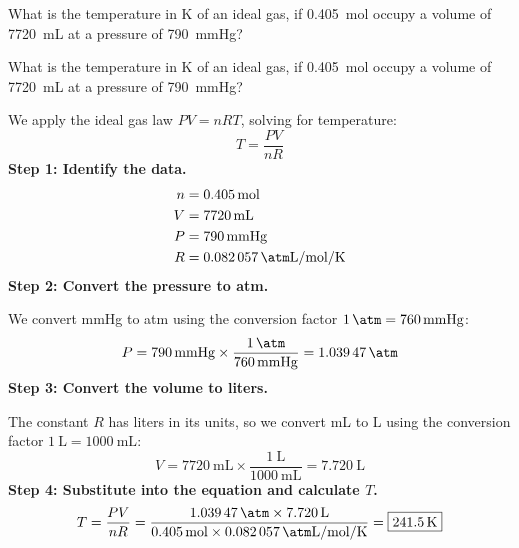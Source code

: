 \begin{exercise}
    What is the temperature in \unit{\kelvin} of an ideal gas, if \qty{0.405}{\mole} occupy a volume of \qty{7720}{\mL} at a pressure of \qty{790}{\mmHg}?
    \begin{solu}
        What is the temperature in \unit{\kelvin} of an ideal gas, if \qty{0.405}{\mole} occupy a volume of \qty{7720}{\mL} at a pressure of \qty{790}{\mmHg}?

        We apply the ideal gas law $PV = nRT$, solving for temperature:
        \begin{equation*}
            T = \frac{PV}{nR}
        \end{equation*}
        \textbf{Step 1: Identify the data.}
        \begin{align*}
            n &= \qty{0.405}{\mol} \\
            V &= \qty{7720}{\mL} \\
            P &= \qty{790}{\mmHg} \\
            R &= \qty{0.082057}{\atm\liter\per\mol\per\kelvin}
        \end{align*}
        \textbf{Step 2: Convert the pressure to atm.}

        We convert mmHg to atm using the conversion factor $\qty{1}{\atm} = \qty{760}{\mmHg}$:
        \begin{equation*}
            P = \qty{790}{\mmHg} \times \frac{\qty{1}{\atm}}{\qty{760}{\mmHg}} = \qty{1.03947}{\atm}
        \end{equation*}
        \textbf{Step 3: Convert the volume to liters.}

        The constant $R$ has liters in its units, so we convert mL to L using the conversion factor $\qty{1}{\liter} = \qty{1000}{\mL}$:
        \begin{equation*}
            V = \qty{7720}{\mL} \times \frac{\qty{1}{\liter}}{\qty{1000}{\mL}} = \qty{7.720}{\liter}
        \end{equation*}
        \textbf{Step 4: Substitute into the equation and calculate $T$.}
        \begin{equation*}
            T = \frac{PV}{nR} = \frac{\qty{1.03947}{\atm} \times \qty{7.720}{\liter}}{\qty{0.405}{\mol} \times \qty{0.082057}{\atm\liter\per\mol\per\kelvin}} = \boxed{\qty{241.5}{\kelvin}}
        \end{equation*}
    \end{solu}
\end{exercise}
